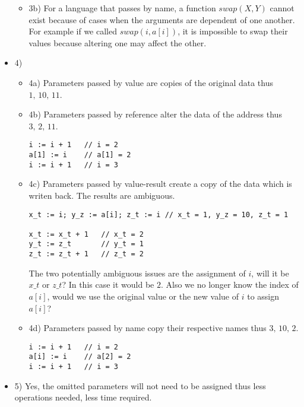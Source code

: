 \documentclass[ 12pt ]{article}
\begin{document}
\begin{itemize}
\begin{itemize}
		\item[] {\large 3b)}
		For a language that passes by name, a function $swap(X,Y)$ cannot exist because of cases when the arguments are dependent of
		one another. For example if we called $swap(i, a[i])$, it is impossible to swap their values because altering one may affect
		the other.
	\end{itemize}
	\newpage

	\item[] {\large 4)}
	\begin{itemize}
		\item[] {\large 4a)}
		Parameters passed by value are copies of the original data thus $1,\, 10,\, 11$.

		\item[] {\large 4b)}
		Parameters passed by reference alter the data of the address thus $3,\, 2,\, 11$.
		\begin{lstlisting}
i := i + 1   // i = 2
a[1] := i    // a[1] = 2
i := i + 1   // i = 3
		\end{lstlisting}

		\item[] {\large 4c)}
		Parameters passed by value-result create a copy of the data which is writen back. The results are ambiguous.
		\begin{lstlisting}
x_t := i; y_z := a[i]; z_t := i // x_t = 1, y_z = 10, z_t = 1

x_t := x_t + 1   // x_t = 2
y_t := z_t       // y_t = 1
z_t := z_t + 1   // z_t = 2
		\end{lstlisting}
		The two potentially ambiguous issues are the assignment of $i$, will it be $x\_t$ or $z\_t$? In this case it would be $2$.
		Also we no longer know the index of $a[i]$, would we use the original value or the new value of $i$ to assign $a[i]$?

		\item[] {\large 4d)}
		Parameters passed by name copy their respective names thus $3,\, 10,\, 2$.
		\begin{lstlisting}
i := i + 1   // i = 2
a[i] := i    // a[2] = 2
i := i + 1   // i = 3
		\end{lstlisting}
	\end{itemize}

	\item[] {\large 5)}
	Yes, the omitted parameters will not need to be assigned thus less operations needed, less time required.


\end{itemize}
\end{document}
